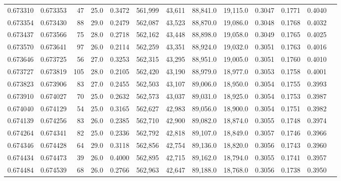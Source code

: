 \begin{tabular}{rrrrrrrrrrrrr}
0.673310 & 0.673353 &    47 & 25.0 &                                     0.3472 & 561,999 &  43,611 &  88,841.0 &  19,115.0 & 0.3047 & 0.1771 & 0.4040 \\
0.673354 & 0.673430 &    88 & 29.0 &                                     0.2479 & 562,087 &  43,523 &  88,870.0 &  19,086.0 & 0.3048 & 0.1768 & 0.4032 \\
0.673437 & 0.673566 &    75 & 28.0 &                                     0.2718 & 562,162 &  43,448 &  88,898.0 &  19,058.0 & 0.3049 & 0.1765 & 0.4025 \\
0.673570 & 0.673641 &    97 & 26.0 &                                     0.2114 & 562,259 &  43,351 &  88,924.0 &  19,032.0 & 0.3051 & 0.1763 & 0.4016 \\
0.673646 & 0.673725 &    56 & 27.0 &                                     0.3253 & 562,315 &  43,295 &  88,951.0 &  19,005.0 & 0.3051 & 0.1760 & 0.4010 \\
0.673727 & 0.673819 &   105 & 28.0 &                                     0.2105 & 562,420 &  43,190 &  88,979.0 &  18,977.0 & 0.3053 & 0.1758 & 0.4001 \\
0.673823 & 0.673906 &    83 & 27.0 &                                     0.2455 & 562,503 &  43,107 &  89,006.0 &  18,950.0 & 0.3054 & 0.1755 & 0.3993 \\
0.673910 & 0.674027 &    70 & 25.0 &                                     0.2632 & 562,573 &  43,037 &  89,031.0 &  18,925.0 & 0.3054 & 0.1753 & 0.3987 \\
0.674040 & 0.674129 &    54 & 25.0 &                                     0.3165 & 562,627 &  42,983 &  89,056.0 &  18,900.0 & 0.3054 & 0.1751 & 0.3982 \\
0.674139 & 0.674256 &    83 & 26.0 &                                     0.2385 & 562,710 &  42,900 &  89,082.0 &  18,874.0 & 0.3055 & 0.1748 & 0.3974 \\
0.674264 & 0.674341 &    82 & 25.0 &                                     0.2336 & 562,792 &  42,818 &  89,107.0 &  18,849.0 & 0.3057 & 0.1746 & 0.3966 \\
0.674346 & 0.674428 &    64 & 29.0 &                                     0.3118 & 562,856 &  42,754 &  89,136.0 &  18,820.0 & 0.3056 & 0.1743 & 0.3960 \\
0.674434 & 0.674473 &    39 & 26.0 &                                     0.4000 & 562,895 &  42,715 &  89,162.0 &  18,794.0 & 0.3055 & 0.1741 & 0.3957 \\
0.674484 & 0.674539 &    68 & 26.0 &                                     0.2766 & 562,963 &  42,647 &  89,188.0 &  18,768.0 & 0.3056 & 0.1738 & 0.3950 \\

\end{tabular}
